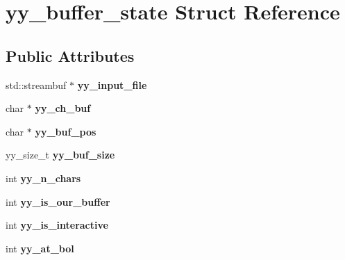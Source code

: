 \hypertarget{structyy__buffer__state}{}\section{yy\+\_\+buffer\+\_\+state Struct Reference}
\label{structyy__buffer__state}
\subsection*{Public Attributes}
\begin{DoxyCompactItemize}
\item 
std\+::streambuf $\ast$ {\bfseries yy\+\_\+input\+\_\+file}\hypertarget{structyy__buffer__state_a12e620b77c34006d4136af482383421b}{}\label{structyy__buffer__state_a12e620b77c34006d4136af482383421b}

\item 
char $\ast$ {\bfseries yy\+\_\+ch\+\_\+buf}\hypertarget{structyy__buffer__state_ad7b8df8d8a4688e57b0b8d3ca75adc85}{}\label{structyy__buffer__state_ad7b8df8d8a4688e57b0b8d3ca75adc85}

\item 
char $\ast$ {\bfseries yy\+\_\+buf\+\_\+pos}\hypertarget{structyy__buffer__state_a58aa927f098b99d99e75da80f9b681ef}{}\label{structyy__buffer__state_a58aa927f098b99d99e75da80f9b681ef}

\item 
yy\+\_\+size\+\_\+t {\bfseries yy\+\_\+buf\+\_\+size}\hypertarget{structyy__buffer__state_a48302f5f3477a9c78bbddf56d356ef54}{}\label{structyy__buffer__state_a48302f5f3477a9c78bbddf56d356ef54}

\item 
int {\bfseries yy\+\_\+n\+\_\+chars}\hypertarget{structyy__buffer__state_a06406208824817acfec2183b79080945}{}\label{structyy__buffer__state_a06406208824817acfec2183b79080945}

\item 
int {\bfseries yy\+\_\+is\+\_\+our\+\_\+buffer}\hypertarget{structyy__buffer__state_a80ce2431c70dc4f89ced487f18449465}{}\label{structyy__buffer__state_a80ce2431c70dc4f89ced487f18449465}

\item 
int {\bfseries yy\+\_\+is\+\_\+interactive}\hypertarget{structyy__buffer__state_abf5c70eea75581b58c0ee7bd31b14490}{}\label{structyy__buffer__state_abf5c70eea75581b58c0ee7bd31b14490}

\item 
int {\bfseries yy\+\_\+at\+\_\+bol}\hypertarget{structyy__buffer__state_a9d60c60af6e1a6f69de16871fd64f85f}{}\label{structyy__buffer__state_a9d60c60af6e1a6f69de16871fd64f85f}


\end{DoxyCompactItemize}
